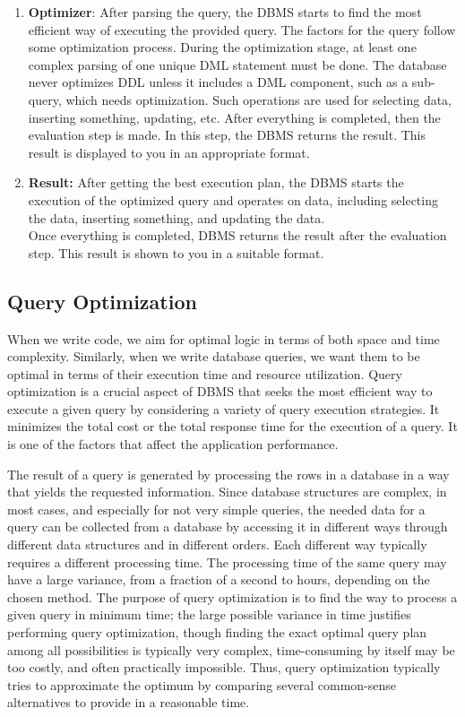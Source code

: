 \begin{enumerate}
    \item \textbf{Optimizer}: After parsing the query, the DBMS starts to find the most efficient way of executing the provided query. The factors for the query follow some optimization process. During the optimization stage, at least one complex parsing of one unique DML statement must be done. The database never optimizes DDL unless it includes a DML component, such as a sub-query, which needs optimization. Such operations are used for selecting data, inserting something, updating, etc. After everything is completed, then the evaluation step is made. In this step, the DBMS returns the result. This result is displayed to you in an appropriate format.
    \item \textbf{Result:} After getting the best execution plan, the DBMS starts the execution of the optimized query and operates on data, including selecting the data, inserting something, and updating the data.\\
    Once everything is completed, DBMS returns the result after the evaluation step. This result is shown to you in a suitable format.\cite{Query,QueryProcessing,Oracle}
\end{enumerate}

\subsection{Query Optimization }When we write code, we aim for optimal logic in terms of both space and time complexity. Similarly, when we write database queries, we want them to be optimal in terms of their execution time and resource utilization. Query optimization is a crucial aspect of DBMS that seeks the most efficient way to execute a given query by considering a variety of query execution strategies. It minimizes the total cost or the total response time for the execution of a query. It is one of the factors that affect the application performance.\vspace{.4cm}

The result of a query is generated by processing the rows in a database in a way that yields the requested information. Since database structures are complex, in most cases, and especially for not very simple queries, the needed data for a query can be collected from a database by accessing it in different ways through different data structures and in different orders\cite{selinger-1979}. Each different way typically requires a different processing time. The processing time of the same query may have a large variance, from a fraction of a second to hours, depending on the chosen method. The purpose of query optimization is to find the way to process a given query in minimum time; the large possible variance in time justifies performing query optimization, though finding the exact optimal query plan among all possibilities is typically very complex, time-consuming by itself may be too costly, and often practically impossible. Thus, query optimization typically tries to approximate the optimum by comparing several common-sense alternatives to provide in a reasonable time.\vspace{.4cm}

